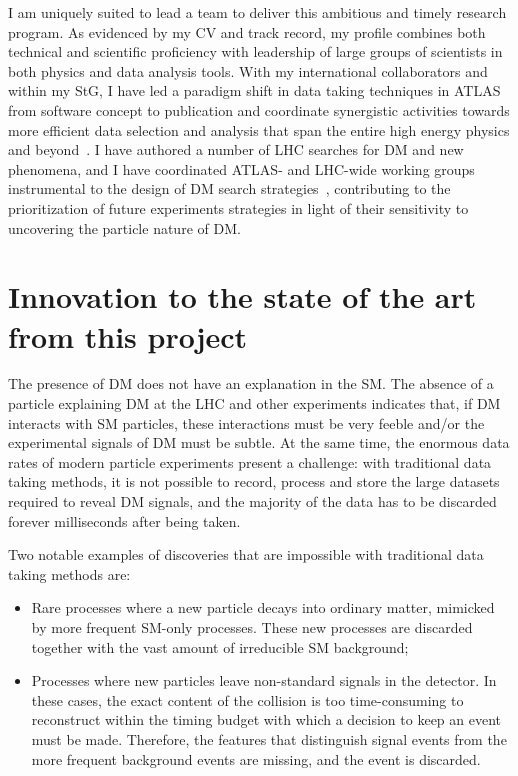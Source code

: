 \documentclass[11pt,a4paper]{article}
\begin{document}
I am uniquely suited to lead a team to deliver this ambitious and timely research program.  
As evidenced by my CV and track record, my profile combines both technical and scientific proficiency with leadership of large groups of scientists in both physics and data analysis tools. 
With my international collaborators and within my StG, I have led a paradigm shift in data taking techniques in ATLAS from software concept to publication and coordinate synergistic activities towards more efficient data selection and analysis that span the entire high energy physics and beyond~\cite{}. I have authored a number of LHC searches for DM and new phenomena, and I have coordinated ATLAS- and LHC-wide working groups instrumental to the design of DM search strategies~\cite{DMWG}, contributing to the prioritization of future experiments strategies in light of their sensitivity to uncovering the particle nature of DM. 

\section{Innovation to the state of the art from this project} 
\smallskip

The presence of DM does not have an explanation in the SM. 
The absence of a particle explaining DM at the LHC and other experiments indicates that, if DM interacts with SM particles, these interactions must be very feeble and/or the experimental signals of DM must be subtle. 
At the same time, the enormous data rates of modern particle experiments present a challenge: with traditional data taking methods, it is not possible to record, process and store the large datasets required to reveal DM signals, and the majority of the data has to be discarded forever milliseconds after being taken. 
  
Two notable examples of discoveries that are impossible with traditional data taking methods are:
\begin{itemize} 
\item Rare processes where a new particle decays into ordinary matter, mimicked by more frequent SM-only processes.
These new processes are discarded together with the vast amount of irreducible SM background;
\item Processes where new particles leave non-standard signals in the detector. 
In these cases, the exact content of the collision is too time-consuming to reconstruct within the timing budget with which a decision to keep an event must be made. Therefore, the features that distinguish signal events from the more frequent background events are missing, and the event is discarded.
\end{itemize}
\end{document}
